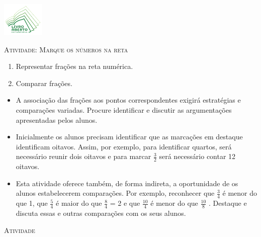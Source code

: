 \documentclass[10 pt,usenames,dvipsnames, oneside]{article}
\begin{document}
\begin{center}
  \begin{minipage}[l]{3cm}
\includegraphics[width=2cm]{../../../Figuras/logo}       
\end{minipage}\hfill
\begin{minipage}[r]{.8\textwidth}
 {\Large \scshape Atividade: Marque os números na reta}  
\end{minipage}
\end{center}
\vspace{.2cm}

\ifdefined\prof
\begin{goals}
\begin{enumerate}
\item       Representar frações na reta numérica.
\item       Comparar frações.
\end{enumerate}

\tcblower

\begin{itemize}
\item  A associação das frações aos pontos correspondentes exigirá estratégias e comparações variadas. Procure identificar e discutir as argumentações apresentadas pelos alunos.
\item  Inicialmente os alunos precisam identificar que as marcações em destaque identificam oitavos. Assim, por exemplo, para identificar quartos, será necessário reunir dois oitavos e para marcar   $\frac{3}{2}$   será necessário contar 12 oitavos.
\item  Esta atividade oferece também, de forma indireta, a oportunidade de os alunos estabelecerem comparações. Por exemplo, reconhecer que   $\frac{3}{4}$   é menor do que 1, que   $\frac{5}{4}$   é maior do que   $\frac{8}{4}$   = 2 e que   $\frac{10}{4}$   é menor do que   $\frac{10}{8}$  . Destaque e discuta essas e outras comparações com os seus alunos.
\end{itemize}
\end{goals}

\bigskip
\begin{center}
{\large \scshape Atividade}
\end{center}
\fi
\end{document}
